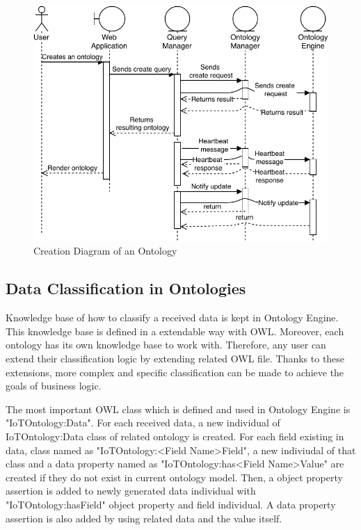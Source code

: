 \begin{figure}[H]
  \centering
  \includegraphics[width=\textwidth,height=\textheight,keepaspectratio]{figures/ontology_creation.pdf}
  \caption[Sequence Diagram for Ontology Creation]{Creation Diagram of an Ontology}\label{fig:ontology_creation}
\end{figure}



\subsection{Data Classification in Ontologies}

Knowledge base of how to classify a received data is kept in Ontology Engine. This knowledge base is defined in a extendable way with OWL. Moreover, each ontology has its own knowledge base to work with. Therefore, any user can extend their classification logic by extending related OWL file. Thanks to these extensions, more complex and specific classification can be made to achieve the goals of business logic.

The most important OWL class which is defined and used in Ontology Engine is "IoTOntology:Data". For each received data, a new individual of IoTOntology:Data class of related ontology is created. For each field existing in data, class named as "IoTOntology:<Field Name>Field", a new indiviudal of that class and a data property named as "IoTOntology:has<Field Name>Value" are created if they do not exist in current ontology model. Then, a object property assertion is added to newly generated data individual with "IoTOntology:hasField" object property and field individual. A data property assertion  is also added by using related data and the value itself.


